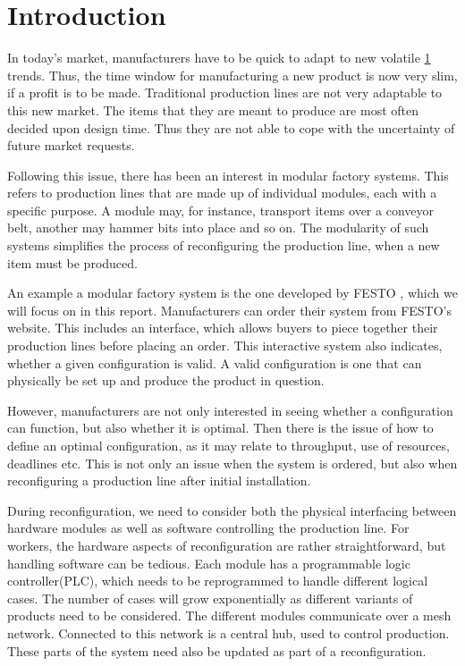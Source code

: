 \chapter{Introduction}
\label{ch:introduction}
In today’s market, manufacturers have to be quick to adapt to new volatile \cref{ch:introduction} trends. Thus, the time window for manufacturing a new product is now very slim, if a profit is to be made. Traditional production lines are not very adaptable to this new market. The items that they are meant to produce are most often decided upon design time. Thus they are not able to cope with the uncertainty of future market requests.

Following this issue, there has been an interest in modular factory systems. This refers to production lines that are made up of individual modules, each with a specific purpose. A module may, for instance, transport items over a conveyor belt, another may hammer bits into place and so on. The modularity of such systems simplifies the process of reconfiguring the production line, when a new item must be produced.

An example a modular factory system is the one developed by FESTO \cite{FESTOweb}, which we will focus on in this report. Manufacturers can order their system from FESTO’s website. This includes an interface, which allows buyers to piece together their production lines before placing an order. This interactive system also indicates, whether a given configuration is valid. A valid configuration is one that can physically be set up and produce the product in question. 

However, manufacturers are not only interested in seeing whether a configuration can function, but also whether it is optimal. Then there is the issue of how to define an optimal configuration, as it may relate to throughput, use of resources, deadlines etc. This is not only an issue when the system is ordered, but also when reconfiguring a production line after initial installation.

During reconfiguration, we need to consider both the physical interfacing between hardware modules as well as software controlling the production line. For workers, the hardware aspects of reconfiguration are rather straightforward, but handling software can be tedious. Each module has a programmable logic controller(PLC), which needs to be reprogrammed to handle different logical cases. The number of cases will grow exponentially as different variants of products need to be considered.  The different modules communicate over a mesh network. Connected to this network is a central hub, used to control production. These parts of the system need also be updated as part of a reconfiguration.

